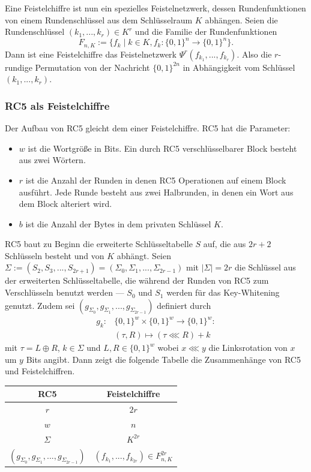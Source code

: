 \documentclass[course=erap]{aspdoc}
\begin{document}
Eine Feistelchiffre ist nun ein spezielles Feistelnetzwerk, dessen Rundenfunktionen von einem Rundenschlüssel aus dem Schlüsselraum $K$ abhängen.
Seien die Rundenschlüssel $(k_1, ..., k_r) \in K^r$ und die Familie der Rundenfunktionen
\[
    F_{n, K} := \{f_k \mid k \in K, f_k \colon \{0, 1\}^n \to \{0, 1\}^n\}.
\]
Dann ist eine Feistelchiffre das Feistelnetzwerk $\Psi^r(f_{k_1},...,f_{k_r})$. Also die $r$-rundige Permutation von der Nachricht $\{0, 1\}^{2n}$ in Abhängigkeit vom Schlüssel $(k_1, ..., k_r)$.\cite[p.14]{nachef}

\subsubsection{RC5 als Feistelchiffre}

Der Aufbau von RC5 gleicht dem einer Feistelchiffre. RC5 hat die Parameter:\cite[p.2f]{rc5rev}

\begin{itemize}
    \item $w$ ist die Wortgröße in Bits. Ein durch RC5 verschlüsselbarer Block besteht aus zwei Wörtern.
    \item $r$ ist die Anzahl der Runden in denen RC5 Operationen auf einem Block ausführt. Jede Runde besteht aus zwei Halbrunden, in denen ein Wort aus dem Block alteriert wird.
    \item $b$ ist die Anzahl der Bytes in dem privaten Schlüssel $K$.
\end{itemize}

RC5 baut zu Beginn die erweiterte Schlüsseltabelle $S$ auf, die aus $2r + 2$ Schlüsseln besteht und von $K$ abhängt. Seien $\Sigma := (S_2, S_3, ..., S_{2r+1}) = (\Sigma_0, \Sigma_1, ..., \Sigma_{2r-1})$ mit $|\Sigma| = 2r$ die Schlüssel aus der erweiterten Schlüsseltabelle, die während der Runden von RC5 zum Verschlüsseln benutzt werden --- $S_0$ und $S_1$ werden für das Key-Whitening genutzt. Zudem sei $(g_{\Sigma_0}, g_{\Sigma_1}, ..., g_{\Sigma_{2r-1}})$ definiert durch
\begin{align*}
    g_k \colon &\{0, 1\}^w \times \{0, 1\}^w \to \{0, 1\}^w \colon \\
               &(\tau, R) \mapsto (\tau \lll R) + k
\end{align*}
mit $\tau = L \oplus R$, $k \in \Sigma$ und $L, R \in \{0, 1\}^w$ wobei $x \lll y$ die Linksrotation von $x$ um $y$ Bits angibt. Dann zeigt die folgende Tabelle die Zusammenhänge von RC5 und Feistelchiffren.

\begin{center}
 \begin{tabular}{c|c}
 RC5 & Feistelchiffre \\
 \hline
 $r$ & $2r$ \\
 $w$ & $n$ \\
 $\Sigma$ & $K^{2r}$ \\
 $(g_{\Sigma_0}, g_{\Sigma_1}, ..., g_{\Sigma_{2r-1}})$ & $(f_{k_1}, ..., f_{k_{2r}}) \in F^{2r}_{n, K}$ \\
\end{tabular}
\end{center}
\end{document}
